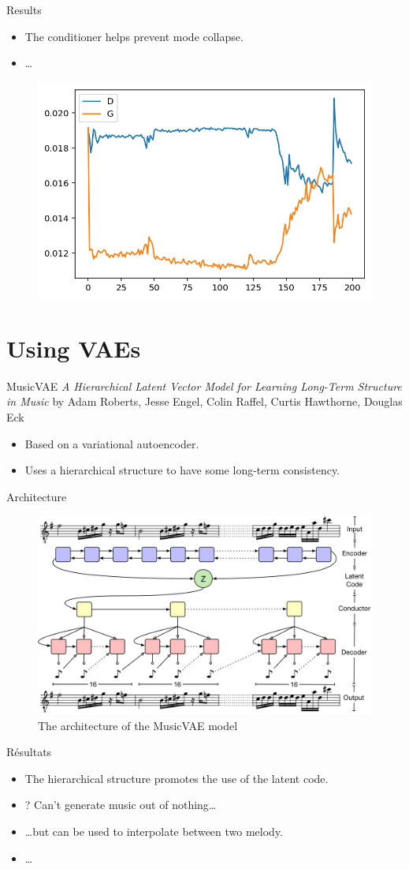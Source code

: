 \documentclass{beamer}
\begin{document}
\begin{frame}{Results}
\begin{itemize}
	\item The conditioner helps prevent mode collapse.
	\item \dots
\end{itemize}
\begin{figure}[h]
\centering
\includegraphics[width=0.6\linewidth]{loss_midinet_w_cond}
\end{figure}
\end{frame}

\section{Using VAEs}
\begin{frame}{MusicVAE}
\textit{A Hierarchical Latent Vector Model for Learning Long-Term Structure in Music}
by Adam Roberts, Jesse Engel, Colin Raffel, Curtis Hawthorne, Douglas Eck
\begin{itemize}
	\item Based on a variational autoencoder.
	\item Uses a hierarchical structure to have some long-term consistency.
\end{itemize}
\end{frame}

\begin{frame}{Architecture}
\begin{figure}[h]
\centering
\includegraphics[width=\linewidth]{musicVAE}
\caption{The architecture of the MusicVAE model}
\end{figure}
\end{frame}

\begin{frame}{Résultats}
\begin{itemize}
	\item The hierarchical structure promotes the use of the latent code.
	\item ? Can't generate music out of nothing\dots
	\item \dots but can be used to interpolate between two melody.
	\item \dots
\end{itemize}
\end{frame}
\end{document}
